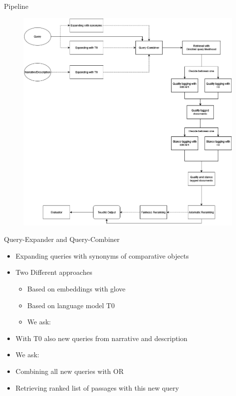 \documentclass[english]{mlutalk}
\begin{document}
\begin{frame}{Pipeline}
    \begin{figure}
        \centering
        \includegraphics[scale=0.25]{figures/pipeline}
    \end{figure}
\end{frame}

\begin{frame}{Query-Expander and Query-Combiner}
    \begin{itemize}
        \item Expanding queries with synonyms of comparative objects
        \item Two Different approaches
        \begin{itemize}
            \item Based on embeddings with glove
            \item Based on language model T0~\cite{SanhWRBSACSLRDBXTSSKCNDCJWMSYPBWNRSSFFTBGBWR2021}
            \item We ask: 
        \end{itemize}
        \item With T0 also new queries from narrative and description
        \item We ask: 
        \item Combining all new queries with OR
        \item Retrieving ranked list of passages with this new query 
    \end{itemize}
\end{frame}
\end{document}
